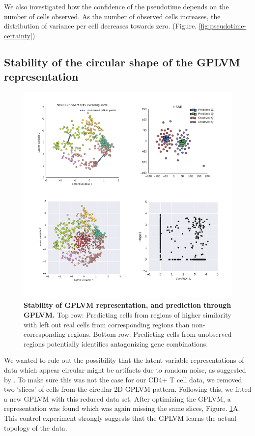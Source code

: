 We also investigated how the confidence of the pseudotime depends on the number of cells observed. As the number of observed cells increases, the distribution of variance per cell decreases towards zero. (Figure. \ref{fig:pseudotime-certainty})

\subsection{Stability of the circular shape of the GPLVM representation}

\begin{figure}
    \centering
    \includegraphics[width=\textwidth]{"fig-prediction"}
    \caption[Stability of GPLVM representation, and prediction through GPLVM]{\textbf{Stability of GPLVM representation, and prediction through GPLVM.} Top row: Predicting cells from regions of higher similarity with left out real cells from corresponding regions than non-corresponding regions. Bottom row: Predicting cells from unobserved regions potentially identifies antagonizing gene combinations.}
    \label{fig:prediction}
\end{figure}

We wanted to rule out the possibility that the latent variable representations of data which appear circular might be artifacts due to random noise, as suggested by \cite{Diaconis2008-lp}. To make sure this was not the case for our CD4+ T cell data, we removed two `slices' of cells from the circular 2D GPLVM pattern. Following this, we fitted a new GPLVM with this reduced data set. After optimizing the GPLVM, a representation was found which was again missing the same slices, Figure. \ref{fig:prediction}A. This control experiment strongly suggests that the GPLVM learns the actual topology of the data.

